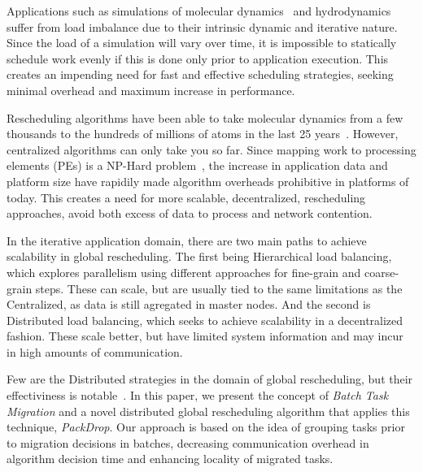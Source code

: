 Applications such as simulations of molecular dynamics~\cite{namd} and hydrodynamics~\cite{IPDPS13:LULESH} suffer from load imbalance due to their intrinsic dynamic and iterative nature.
Since the load of a simulation will vary over time, it is impossible to statically schedule work evenly if this is done only prior to application execution.
This creates an impending need for fast and effective scheduling strategies, seeking minimal overhead and maximum increase in performance.

Rescheduling algorithms have been able to take molecular dynamics from a few thousands to the hundreds of millions of atoms in the last 25 years~\cite{namd0}.
However, centralized algorithms can only take you so far.
Since mapping work to processing elements (PEs) is a NP-Hard problem~\cite{npcomplete}, the increase in application data and platform size have rapidily made algorithm overheads prohibitive in platforms of today.
This creates a need for more scalable, decentralized, rescheduling approaches, avoid both excess of data to process and network contention.

In the iterative application domain, there are two main paths to achieve scalability in global rescheduling.
The first being Hierarchical load balancing, which explores parallelism using different approaches for fine-grain and coarse-grain steps.
These can scale, but are usually tied to the same limitations as the Centralized, as data is still agregated in master nodes.
And the second is Distributed load balancing, which seeks to achieve scalability in a decentralized fashion.
These scale better, but have limited system information and may incur in high amounts of communication.

Few are the Distributed strategies in the domain of global rescheduling, but their effectiviness is notable~\cite{grapevine,diffus}.
In this paper, we present the concept of \textit{Batch Task Migration} and a novel distributed global rescheduling algorithm that applies this technique, \textit{PackDrop}.
Our approach is based on the idea of grouping tasks prior to migration decisions in batches, decreasing communication overhead in algorithm decision time and enhancing locality of migrated tasks.



